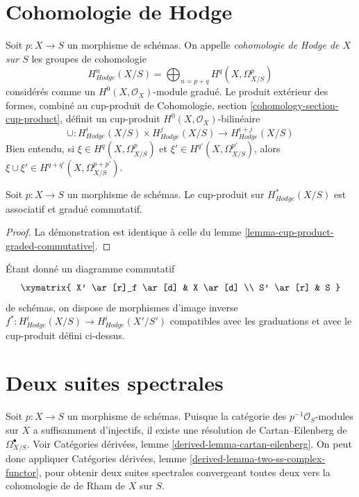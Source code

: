 \section{Cohomologie de Hodge}
\label{section-hodge-cohomology}

\noindent
Soit $p : X \to S$ un morphisme de schémas. On appelle
{\it cohomologie de Hodge de $X$ sur $S$} les groupes de cohomologie
$$
H^n_{Hodge}(X/S) = \bigoplus\nolimits_{n = p + q} H^q(X, \Omega^p_{X/S})
$$
considérés comme un $H^0(X, \mathcal{O}_X)$-module gradué. Le produit extérieur
des formes, combiné au cup-produit de
Cohomologie, section \ref{cohomology-section-cup-product},
définit un cup-produit $H^0(X, \mathcal{O}_X)$-bilinéaire
$$
\cup :
H^i_{Hodge}(X/S) \times H^j_{Hodge}(X/S)
\longrightarrow
H^{i + j}_{Hodge}(X/S)
$$
Bien entendu, si $\xi \in H^q(X, \Omega^p_{X/S})$ et
$\xi' \in H^{q'}(X, \Omega^{p'}_{X/S})$, alors $\xi \cup \xi' \in
H^{q + q'}(X, \Omega^{p + p'}_{X/S})$.

\begin{lemma}
\label{lemma-cup-product-hodge-graded-commutative}
Soit $p : X \to S$ un morphisme de schémas.
Le cup-produit sur $H^*_{Hodge}(X/S)$ est associatif et gradué commutatif.
\end{lemma}

\begin{proof}
La démonstration est identique à celle du
lemme \ref{lemma-cup-product-graded-commutative}.
\end{proof}

\noindent
Étant donné un diagramme commutatif
$$
\xymatrix{
X' \ar[r]_f \ar[d] & X \ar[d] \\
S' \ar[r] & S
}
$$
de schémas, on dispose de morphismes d'image inverse
$f^* : H^i_{Hodge}(X/S) \longrightarrow H^i_{Hodge}(X'/S')$
compatibles avec les graduations et avec le cup-produit défini ci-dessus.







\section{Deux suites spectrales}
\label{section-hodge-to-de-rham}

\noindent
Soit $p : X \to S$ un morphisme de schémas. Puisque la catégorie
des $p^{-1}\mathcal{O}_S$-modules sur $X$ a suffisamment d'injectifs,
il existe une résolution de Cartan--Eilenberg de $\Omega^\bullet_{X/S}$.
Voir Catégories dérivées, lemme \ref{derived-lemma-cartan-eilenberg}.
On peut donc appliquer Catégories dérivées, lemme
\ref{derived-lemma-two-ss-complex-functor}, pour obtenir deux suites spectrales
convergeant toutes deux vers la cohomologie de de Rham de $X$ sur $S$.

